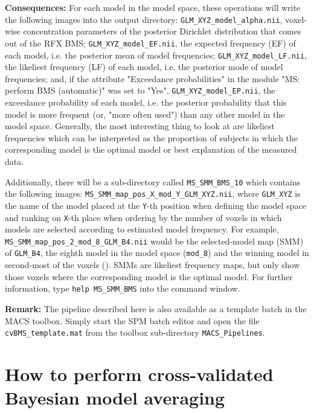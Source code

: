\documentclass[a4paper,12pt]{article}
\begin{document}
\textbf{Consequences:} For each model in the model space, these operations will write the following images into the output directory: \texttt{GLM\_XYZ\_model\_alpha.nii}, voxel-wise concentration parameters of the posterior Dirichlet distribution that comes out of the RFX BMS; \texttt{GLM\_XYZ\_model\_EF.nii}, the expected frequency (EF) of each model, i.e. the posterior mean of model frequencies; \texttt{GLM\_XYZ\_model\_LF.nii}, the likeliest frequency (LF) of each model, i.e. the posterior mode of model frequencies; and, if the attribute "Exceedance probabilities" in the module "MS: perform BMS (automatic)" was set to "Yes", \texttt{GLM\_XYZ\_model\_EP.nii}, the exceedance probability of each model, i.e. the posterior probability that this model is more frequent (or, "more often used") than any other model in the model space. Generally, the most interesting thing to look at are likeliest frequencies which can be interpreted as the proportion of subjects in which the corresponding model is the optimal model or best explanation of the measured data.

Additionally, there will be a sub-directory called \texttt{MS\_SMM\_BMS\_10} which contains the following images: \texttt{MS\_SMM\_map\_pos\_X\_mod\_Y\_GLM\_XYZ.nii}, where \texttt{GLM\_XYZ} is the name of the model placed at the \texttt{Y}-th position when defining the model space and ranking on \texttt{X}-th place when ordering by the number of voxels in which models are selected according to estimated model frequency. For example, \texttt{MS\_SMM\_map\_pos\_2\_mod\_8\_GLM\_B4.nii} would be the selected-model map (SMM) of \texttt{GLM\_B4}, the eighth model in the model space (\texttt{mod\_8}) and the winning model in second-most of the voxels (). SMMs are likeliest frequency maps, but only show those voxels where the corresponding model is the optimal model. For further information, type \texttt{help MS\_SMM\_BMS} into the command window.

\textbf{Remark:} The pipeline described here is also available as a template batch in the MACS toolbox. Simply start the SPM batch editor and open the file \texttt{cvBMS\_template.mat} from the toolbox sub-directory \texttt{MACS\_Pipelines}.



\pagebreak
\section[How to perform cross-validated Bayesian model averaging]{How to perform cross-validated \\ Bayesian model averaging} \label{sec:cvBMA}
\end{document}
